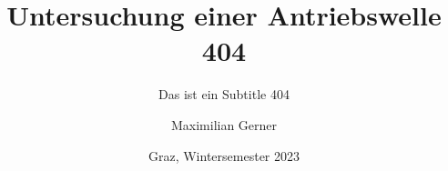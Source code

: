 
\def\getsubject{Bericht 404}   
\subject{\getsubject}   %

\def\gettitle{Untersuchung einer Antriebswelle 404}
\title{\gettitle}

\def\getsubtitle{Das ist ein Subtitle 404}
\subtitle{\getsubtitle\\[60pt]}

\def\getauthor{Maximilian Gerner}
\author{\getauthor}

\def\getdate{Graz, Wintersemester 2023}
\date{\getdate}







\usepackage{ngerman}


\usepackage[utf8]{inputenc}


\usepackage[T1]{fontenc}
\usepackage{ae, aecompl}


\usepackage{amsmath, amssymb, amstext}

\usepackage{mathtools}


